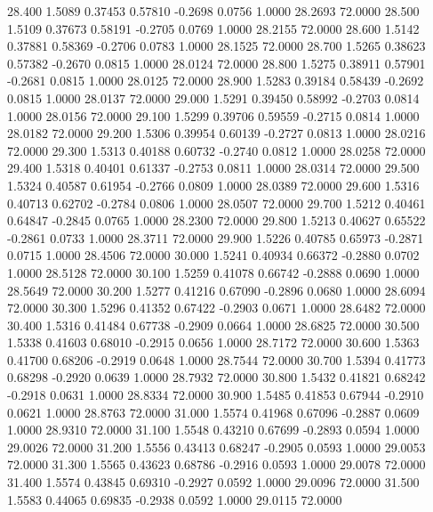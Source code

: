   28.400   1.5089   0.37453   0.57810  -0.2698   0.0756   1.0000  28.2693  72.0000
  28.500   1.5109   0.37673   0.58191  -0.2705   0.0769   1.0000  28.2155  72.0000
  28.600   1.5142   0.37881   0.58369  -0.2706   0.0783   1.0000  28.1525  72.0000
  28.700   1.5265   0.38623   0.57382  -0.2670   0.0815   1.0000  28.0124  72.0000
  28.800   1.5275   0.38911   0.57901  -0.2681   0.0815   1.0000  28.0125  72.0000
  28.900   1.5283   0.39184   0.58439  -0.2692   0.0815   1.0000  28.0137  72.0000
  29.000   1.5291   0.39450   0.58992  -0.2703   0.0814   1.0000  28.0156  72.0000
  29.100   1.5299   0.39706   0.59559  -0.2715   0.0814   1.0000  28.0182  72.0000
  29.200   1.5306   0.39954   0.60139  -0.2727   0.0813   1.0000  28.0216  72.0000
  29.300   1.5313   0.40188   0.60732  -0.2740   0.0812   1.0000  28.0258  72.0000
  29.400   1.5318   0.40401   0.61337  -0.2753   0.0811   1.0000  28.0314  72.0000
  29.500   1.5324   0.40587   0.61954  -0.2766   0.0809   1.0000  28.0389  72.0000
  29.600   1.5316   0.40713   0.62702  -0.2784   0.0806   1.0000  28.0507  72.0000
  29.700   1.5212   0.40461   0.64847  -0.2845   0.0765   1.0000  28.2300  72.0000
  29.800   1.5213   0.40627   0.65522  -0.2861   0.0733   1.0000  28.3711  72.0000
  29.900   1.5226   0.40785   0.65973  -0.2871   0.0715   1.0000  28.4506  72.0000
  30.000   1.5241   0.40934   0.66372  -0.2880   0.0702   1.0000  28.5128  72.0000
  30.100   1.5259   0.41078   0.66742  -0.2888   0.0690   1.0000  28.5649  72.0000
  30.200   1.5277   0.41216   0.67090  -0.2896   0.0680   1.0000  28.6094  72.0000
  30.300   1.5296   0.41352   0.67422  -0.2903   0.0671   1.0000  28.6482  72.0000
  30.400   1.5316   0.41484   0.67738  -0.2909   0.0664   1.0000  28.6825  72.0000
  30.500   1.5338   0.41603   0.68010  -0.2915   0.0656   1.0000  28.7172  72.0000
  30.600   1.5363   0.41700   0.68206  -0.2919   0.0648   1.0000  28.7544  72.0000
  30.700   1.5394   0.41773   0.68298  -0.2920   0.0639   1.0000  28.7932  72.0000
  30.800   1.5432   0.41821   0.68242  -0.2918   0.0631   1.0000  28.8334  72.0000
  30.900   1.5485   0.41853   0.67944  -0.2910   0.0621   1.0000  28.8763  72.0000
  31.000   1.5574   0.41968   0.67096  -0.2887   0.0609   1.0000  28.9310  72.0000
  31.100   1.5548   0.43210   0.67699  -0.2893   0.0594   1.0000  29.0026  72.0000
  31.200   1.5556   0.43413   0.68247  -0.2905   0.0593   1.0000  29.0053  72.0000
  31.300   1.5565   0.43623   0.68786  -0.2916   0.0593   1.0000  29.0078  72.0000
  31.400   1.5574   0.43845   0.69310  -0.2927   0.0592   1.0000  29.0096  72.0000
  31.500   1.5583   0.44065   0.69835  -0.2938   0.0592   1.0000  29.0115  72.0000

